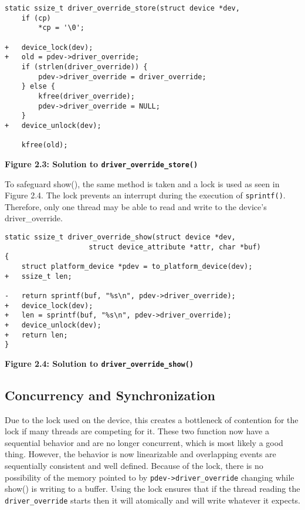 \documentclass[12pt]{article}
\begin{document}
%
% 

\begin{lstlisting}[style=CStyle]
static ssize_t driver_override_store(struct device *dev,
 	if (cp)
 		*cp = '\0';
 
+	device_lock(dev);
+	old = pdev->driver_override;
 	if (strlen(driver_override)) {
 		pdev->driver_override = driver_override;
 	} else {
 		kfree(driver_override);
 		pdev->driver_override = NULL;
 	}
+	device_unlock(dev);
 
 	kfree(old);
\end{lstlisting}
\centerline{\textbf{Figure 2.3: Solution to \texttt{driver\_override\_store()}}}
\vspace{12pt}

To safeguard show(), the same method is taken and a lock is used as seen in Figure 2.4. The lock prevents an interrupt during the execution of \texttt{sprintf()}. Therefore, only one thread may be able to read and write to the device's driver\_override.
\begin{lstlisting}[style=CStyle]
static ssize_t driver_override_show(struct device *dev,
 				    struct device_attribute *attr, char *buf)
{
 	struct platform_device *pdev = to_platform_device(dev);
+	ssize_t len;
 
-	return sprintf(buf, "%s\n", pdev->driver_override);
+	device_lock(dev);
+	len = sprintf(buf, "%s\n", pdev->driver_override);
+	device_unlock(dev);
+	return len;
}
\end{lstlisting}
\centerline{\textbf{Figure 2.4: Solution to \texttt{driver\_override\_show()}}}
\vspace{12pt}

\subsection{Concurrency and Synchronization}
Due to the lock used on the device, this creates a bottleneck of contention for the lock if many threads are competing for it. These two function now have a sequential behavior and are no longer concurrent, which is most likely a good thing. However, the behavior is now linearizable and overlapping events are sequentially consistent and well defined. Because of the lock, there is no possibility of the memory pointed to by \texttt{pdev->driver\_override} changing while show() is writing to a buffer. Using the lock ensures that if the thread reading the \texttt{driver\_override} starts then it will atomically and will write whatever it expects. 
\end{document}
